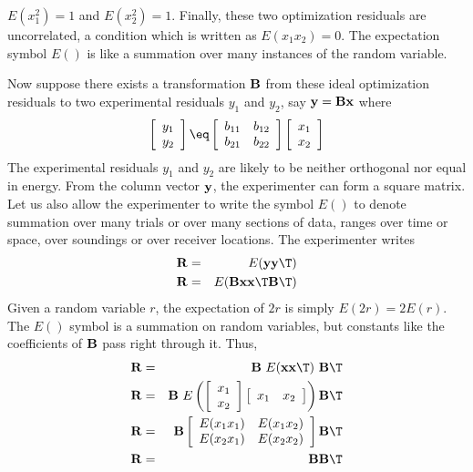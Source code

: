 $E(x_1^2)=1$
and 
$E(x_2^2)=1$.
Finally, these two optimization residuals are uncorrelated,
a condition which is written as $E(x_1 x_2)=0$.
The expectation symbol $E()$ is like a summation
over many instances of the random variable.
\par
Now suppose there exists a transformation $\bold B$
from these ideal optimization residuals
to two experimental residuals $y_1$ and $y_2$, say
$\bold y = \bold B \bold x$ where
\begin{equation}
  \left[
    \begin{array}{l}
      y_1 \\
      y_2
    \end{array}
  \right]
  \eq
  \left[
    \begin{array}{lr}
      b_{11} & b_{12}\\
      b_{21} & b_{22}
    \end{array}
  \right]
  \left[
    \begin{array}{l}
      x_1 \\
      x_2
    \end{array}
  \right]
\end{equation}
The experimental residuals $y_1$ and $y_2$ are
likely to be neither orthogonal nor equal in energy.
From the column vector $\bold y$,
the experimenter can form a square matrix.
Let us also allow the experimenter to write the symbol $E()$
to denote summation over many trials or over many sections
of data, ranges over time or space,
over soundings or over receiver locations.
The experimenter writes
\begin{eqnarray}
\bold R &=& E ( \bold y \bold y\T ) \\
\bold R &=& E ( \bold B \bold x \bold x\T \bold B\T )
\end{eqnarray}
Given a random variable $r$,
the expectation of $2r$ is simply $E(2r)=2E(r)$.
The $E()$ symbol is a summation on random variables,
but constants like the coefficients of $\bold B$ pass
right through it.  Thus,
\begin{eqnarray}
\bold R &=&   \bold B\ E(\bold x \bold x\T)\ \bold B\T \\
\bold R &=&   \bold B\
  E \left(
      \left[
        \begin{array}{l}
          x_1 \\
          x_2
        \end{array}
      \right]
      \left[
        \begin{array}{ll}
          x_1 & x_2
        \end{array}
      \right]
  \right)
\bold B\T
                        \\
\bold R &=&   \bold B
      \left[
        \begin{array}{ll}
          E(x_1 x_1) & E(x_1 x_2)\\
          E(x_2 x_1) & E(x_2 x_2)
        \end{array}
      \right]
\bold B\T
                        \\
\bold R &=&   \bold B \bold B\T
\end{eqnarray}
